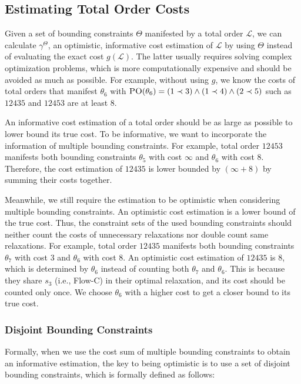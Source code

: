 \documentclass[letterpaper]{article} %
\theoremstyle{definition}
\newcommand{\LE}{\mathcal{L}}
\begin{document}
\subsection{Estimating Total Order Costs}
\label{sec:approach:estimation}
Given a set of bounding constraints $\Theta$ manifested by a total order $\LE$, we can calculate $\gamma^\Theta$, an optimistic, informative cost estimation of $\LE$ by using $\Theta$ instead of evaluating the exact cost $g(\LE)$. The latter usually requires solving complex optimization problems, which is more computationally expensive and should be avoided as much as possible. For example, without using $g$, we know the costs of total orders that manifest $\theta_6$ with $\textsc{PO}(\theta_6) = (1 \prec 3) \land (1 \prec 4) \land (2 \prec 5)$ such as $12435$ and $12453$ are at least $8$.

An informative cost estimation of a total order should be as large as possible to lower bound its true cost. To be informative, we want to incorporate the information of multiple bounding constraints. For example, total order $12453$ manifests both bounding constraints $\theta_5$ with cost $\infty$ and $\theta_6$ with cost $8$. Therefore, the cost estimation of $12435$ is lower bounded by $(\infty+8)$ by summing their costs together. 

Meanwhile, we still require the estimation to be optimistic when considering multiple bounding constraints. An optimistic cost estimation is a lower bound of the true cost. Thus, the constraint sets of the used bounding constraints should neither count the costs of unnecessary relaxations nor double count same relaxations.  For example, total order $12435$ manifests both bounding constraints $\theta_7$ with cost $3$ and $\theta_6$ with cost $8$. An optimistic cost estimation of $12435$ is $8$, which is determined by $\theta_6$ instead of counting both $\theta_7$ and $\theta_6$. This is because they share $s_3$ (i.e., Flow-C) in their optimal relaxation, and its cost should be counted only once. We choose $\theta_6$ with a higher cost to get a closer bound to its true cost. 


\subsubsection{Disjoint Bounding Constraints} Formally, when we use the cost sum of multiple bounding constraints to obtain an informative estimation, the key to being optimistic is to use a set of disjoint bounding constraints, which is formally defined as follows:
\end{document}
